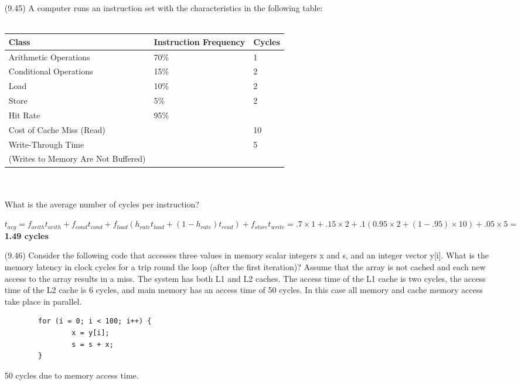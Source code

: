 \documentclass[letterpaper,10pt,titlepage]{article}
\begin{document}
\begin{enumerate}
	\item[(9.45)] A computer runs an instruction set with the characteristics in the
		following table:\\ \\
		\begin{tabular}{ l l l }
			Class & Instruction Frequency & Cycles \\
			\hline
			Arithmetic Operations & 70\% & 1 \\
			Conditional Operations & 15\% & 2 \\
			Load & 10\% & 2 \\
			Store & 5\% & 2 \\
			Hit Rate & 95\% & \\
			Cost of Cache Miss (Read) & & 10 \\
			Write-Through Time & & 5 \\
			(Writes to Memory Are Not Buffered) & & \\ 
		\end{tabular} \\ \\
		What is the average number of cycles per instruction?
	\item[\textbullet] 
		$t_{avg}=f_{arith}t_{arith}+f_{cond}t_{cond}+f_{load}(h_{rate}t_{load}+(1-h_{rate})t_{read})+f_{store}t_{write}=.7\times1+.15\times2+.1(0.95\times2+(1-.95)\times10)+.05\times5=$\textbf{1.49 cycles}

	\item[(9.46)] Consider the following code that accesses three values in memory
		scalar integers x and s, and an integer vector y[i]. What is the memory
		latency in clock cycles for a trip round the loop (after the first
		iteration)? Assume that the array is not cached and each new access to the
		array results in a miss. The system has both L1 and L2 caches. The access
		time of the L1 cache is two cycles, the access time of the L2 cache is 6
		cycles, and main memory has an access time of 50 cycles. In this case all
		memory and cache memory access take place in parallel.
		\begin{verbatim}
		for (i = 0; i < 100; i++) {
		        x = y[i];
		        s = s + x;
		}
		\end{verbatim}
	\item[\textbullet] 50 cycles due to memory access time.


\end{enumerate}
\end{document}
